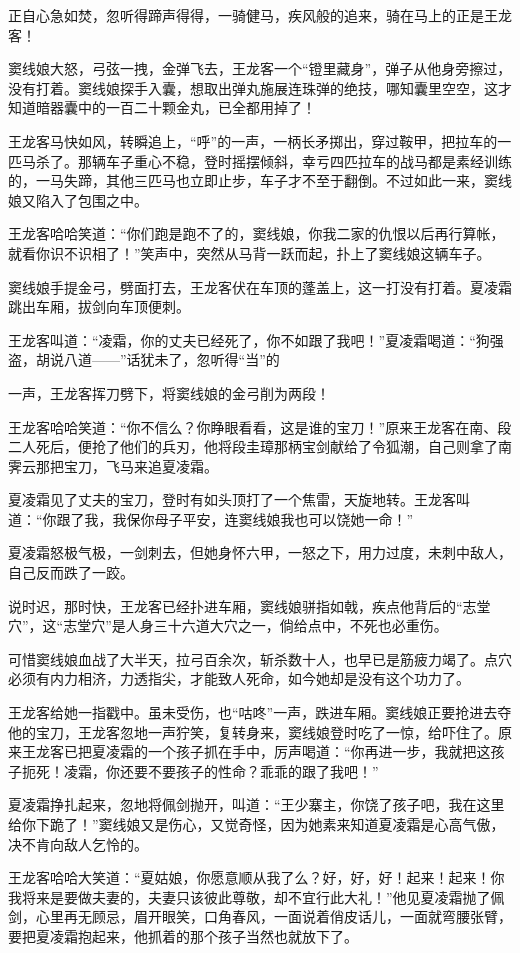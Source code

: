 \documentclass[12pt,oneside]{book}
\begin{document}
正自心急如焚，忽听得蹄声得得，一骑健马，疾风般的追来，骑在马上的正是王龙客！

窦线娘大怒，弓弦一拽，金弹飞去，王龙客一个``镫里藏身''，弹子从他身旁擦过，没有打着。窦线娘探手入囊，想取出弹丸施展连珠弹的绝技，哪知囊里空空，这才知道暗器囊中的一百二十颗金丸，已全都用掉了！

王龙客马快如风，转瞬追上，``呼''的一声，一柄长矛掷出，穿过鞍甲，把拉车的一匹马杀了。那辆车子重心不稳，登时摇摆倾斜，幸亏四匹拉车的战马都是素经训练的，一马失蹄，其他三匹马也立即止步，车子才不至于翻倒。不过如此一来，窦线娘又陷入了包围之中。

王龙客哈哈笑道：``你们跑是跑不了的，窦线娘，你我二家的仇恨以后再行算帐，就看你识不识相了！''笑声中，突然从马背一跃而起，扑上了窦线娘这辆车子。

窦线娘手提金弓，劈面打去，王龙客伏在车顶的蓬盖上，这一打没有打着。夏凌霜跳出车厢，拔剑向车顶便刺。

王龙客叫道：``凌霜，你的丈夫已经死了，你不如跟了我吧！''夏凌霜喝道：``狗强盗，胡说八道------''话犹未了，忽听得``当''的

一声，王龙客挥刀劈下，将窦线娘的金弓削为两段！

王龙客哈哈笑道：``你不信么？你睁眼看看，这是谁的宝刀！''原来王龙客在南、段二人死后，便抢了他们的兵刃，他将段圭璋那柄宝剑献给了令狐潮，自己则拿了南霁云那把宝刀，飞马来追夏凌霜。

夏凌霜见了丈夫的宝刀，登时有如头顶打了一个焦雷，天旋地转。王龙客叫道：``你跟了我，我保你母子平安，连窦线娘我也可以饶她一命！''

夏凌霜怒极气极，一剑刺去，但她身怀六甲，一怒之下，用力过度，未刺中敌人，自己反而跌了一跤。

说时迟，那时快，王龙客已经扑进车厢，窦线娘骈指如戟，疾点他背后的``志堂穴''，这``志堂穴''是人身三十六道大穴之一，倘给点中，不死也必重伤。

可惜窦线娘血战了大半天，拉弓百余次，斩杀数十人，也早已是筋疲力竭了。点穴必须有内力相济，力透指尖，才能致人死命，如今她却是没有这个功力了。

王龙客给她一指戳中。虽未受伤，也``咕咚''一声，跌进车厢。窦线娘正要抢进去夺他的宝刀，王龙客忽地一声狞笑，复转身来，窦线娘登时吃了一惊，给吓住了。原来王龙客已把夏凌霜的一个孩子抓在手中，厉声喝道：``你再进一步，我就把这孩子扼死！凌霜，你还要不要孩子的性命？乖乖的跟了我吧！''

夏凌霜挣扎起来，忽地将佩剑抛开，叫道：``王少寨主，你饶了孩子吧，我在这里给你下跪了！''窦线娘又是伤心，又觉奇怪，因为她素来知道夏凌霜是心高气傲，决不肯向敌人乞怜的。

王龙客哈哈大笑道：``夏姑娘，你愿意顺从我了么？好，好，好！起来！起来！你我将来是要做夫妻的，夫妻只该彼此尊敬，却不宜行此大礼！''他见夏凌霜抛了佩剑，心里再无顾忌，眉开眼笑，口角春风，一面说着俏皮话儿，一面就弯腰张臂，要把夏凌霜抱起来，他抓着的那个孩子当然也就放下了。
\end{document}

